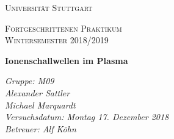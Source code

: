 \documentclass[aps,amsmath,amssymb,amsfont]{revtex4-1}
\numberwithin{equation}{section}
\begin{document}
	\begin{titlepage}
	\centering
	\par\vspace{1cm}
	{\scshape\LARGE Universität Stuttgart \par}
	\vspace{1cm}
	{\scshape\Large  Fortgeschrittenen Praktikum \\ Wintersemester 2018/2019\par}
	\vspace{1.5cm}
	{\huge\bfseries Ionenschallwellen im Plasma\par}
	\vspace{2cm}
	{\Large\itshape Gruppe: M09\\ Alexander Sattler  \\  Michael Marquardt    \\ Versuchsdatum: Montag 17. Dezember 2018\\ Betreuer: Alf Köhn\\ \par}
	
	\end{titlepage}


\tableofcontents

%
%

%
\end{document}
